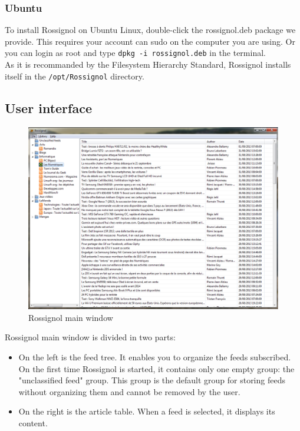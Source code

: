 \documentclass[11pt]{article} %
\begin{document}
\subsubsection{Ubuntu}
To install Rossignol on Ubuntu Linux, double-click the rossignol.deb package 
we provide. This requires your account can sudo on the computer you are using. 
Or you can login as root and type \texttt{dpkg -i rossignol.deb} in the terminal. 
\\
As it is recommanded by the Filesystem Hierarchy Standard, Rossignol installs 
itself in the \texttt{/opt/Rossignol} directory. 

\subsection{User interface}

\begin{figure}[h]
\includegraphics[width=15cm]{img/screen_rossignol.png}
\caption{Rossignol main window}
\end{figure}

Rossignol main window is divided in two parts:
\begin{itemize}
\item On the left is the feed tree. It enables you to organize the feeds 
subscribed. On the first time Rossignol is started, it contains only one empty 
group: the "unclassified feed" group. This group is the default group for 
storing feeds without organizing them and cannot be removed by the user.
\item On the right is the article table. When a feed is selected, it displays 
its content. 
\end{itemize}
\end{document}
